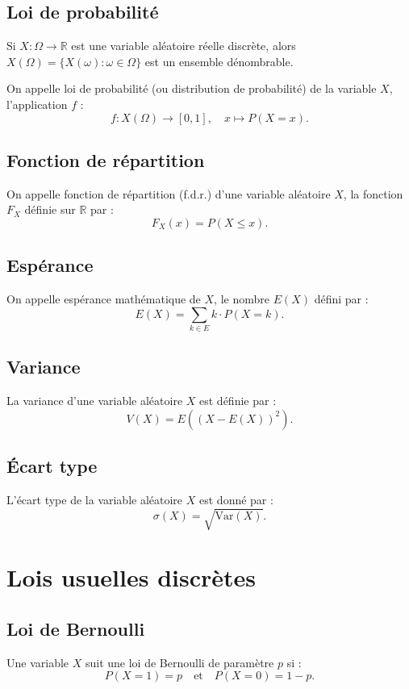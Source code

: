 \documentclass[a4paper,12pt]{article}
\begin{document}
\subsection{Loi de probabilité}

Si $X : \Omega \to \mathbb{R}$ est une variable aléatoire réelle discrète, alors $X(\Omega) = \{X(\omega) : \omega \in \Omega\}$ est un ensemble dénombrable. 

On appelle loi de probabilité (ou distribution de probabilité) de la variable $X$, l'application $f$ :
\[
f : X(\Omega) \to [0, 1], \quad x \mapsto P(X = x).
\]

\subsection{Fonction de répartition}

On appelle fonction de répartition (f.d.r.) d'une variable aléatoire $X$, la fonction $F_X$ définie sur $\mathbb{R}$ par :
\[
F_X(x) = P(X \leq x).
\]

\subsection{Espérance}

On appelle espérance mathématique de $X$, le nombre $E(X)$ défini par :
\[
E(X) = \sum_{k \in E} k \cdot P(X = k).
\]

\subsection{Variance}

La variance d'une variable aléatoire $X$ est définie par :
\[
V(X) = E((X - E(X))^2).
\]

\subsection{Écart type}

L'écart type de la variable aléatoire $X$ est donné par :
\[
\sigma(X) = \sqrt{\text{Var}(X)}.
\]

\section{Lois usuelles discrètes}

\subsection{Loi de Bernoulli}
Une variable $X$ suit une loi de Bernoulli de paramètre $p$ si :
\[
P(X = 1) = p \quad \text{et} \quad P(X = 0) = 1 - p.
\]
\end{document}
